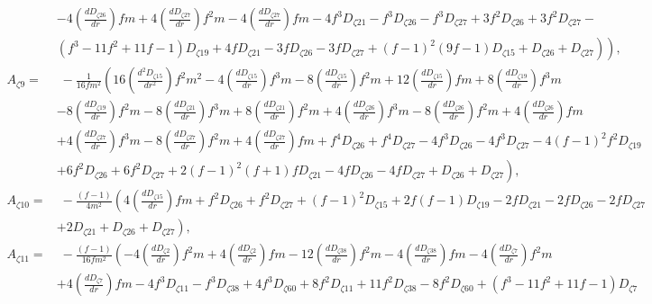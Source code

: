 \documentclass[10pt,twocolumn,preprintnumbers,amsmath,amssymb,nofootinbib
,superscriptaddress]{revtex4-1}
\begin{document}
{{{\begin{widetext}
\begin{align}
 &\left.\left.-4 \left(\frac{dD_{\zeta26}}{dr}\right) f m+4 \left(\frac{dD_{\zeta27}}{dr}\right) f^2 m-4
 \left(\frac{dD_{\zeta27}}{dr}\right) f m-4 f^3 D_{\zeta21}-f^3 D_{\zeta26}-f^3
 D_{\zeta27}+3 f^2 D_{\zeta26}+3 f^2
 D_{\zeta27}-\right.\right.\nonumber\\
 &\left.\left.\left(f^3-11 f^2+11 f-1\right) D_{\zeta19}+4 f
 D_{\zeta21}-3 f D_{\zeta26}-3 f
 D_{\zeta27}+(f-1)^2 (9 f-1)
 D_{\zeta15}+D_{\zeta26}+D_{\zeta27}\right)\right), \nonumber\\
A_{\zeta9}=&\;-\frac{1}{16 f m^2}\left(16 \left(\frac{d^2D_{\zeta15}}{dr^2}\right) f^2 m^2-4 \left(\frac{dD_{\zeta15}}{dr}\right) f^3 m-8 \left(\frac{dD_{\zeta15}}{dr}\right) f^2 m+12 \left(\frac{dD_{\zeta15}}{dr}\right)
 f m+8 \left(\frac{dD_{\zeta19}}{dr}\right) f^3 m\right.\nonumber\\
 &\left.-8 \left(\frac{dD_{\zeta19}}{dr}\right) f^2 m-8 \left(\frac{dD_{\zeta21}}{dr}\right) f^3 m+8 \left(\frac{dD_{\zeta21}}{dr}\right) f^2
 m+4 \left(\frac{dD_{\zeta26}}{dr}\right) f^3 m-8 \left(\frac{dD_{\zeta26}}{dr}\right) f^2 m+4 \left(\frac{dD_{\zeta26}}{dr}\right) f m\right.\nonumber\\
 &\left.+4 \left(\frac{dD_{\zeta27}}{dr}\right) f^3 m-8
 \left(\frac{dD_{\zeta27}}{dr}\right) f^2 m+4 \left(\frac{dD_{\zeta27}}{dr}\right) f m+f^4 D_{\zeta26}+f^4
 D_{\zeta27}-4 f^3 D_{\zeta26}-4 f^3
 D_{\zeta27}-4 (f-1)^2 f^2 D_{\zeta19}\right.\nonumber\\
 &\left.+6 f^2
 D_{\zeta26}+6 f^2 D_{\zeta27}+2 (f-1)^2 (f+1) f
 D_{\zeta21}-4 f D_{\zeta26}-4 f
 D_{\zeta27}+D_{\zeta26}+D_{\zeta27}\right), \nonumber\\
 A_{\zeta10}=&\;-\frac{(f-1)}{4
 m^2} \left(4 \left(\frac{dD_{\zeta15}}{dr}\right) f m+f^2 D_{\zeta26}+f^2
 D_{\zeta27}+(f-1)^2 D_{\zeta15}+2 f (f-1)
 D_{\zeta19}-2 f D_{\zeta21}-2 f D_{\zeta26}-2 f
 D_{\zeta27}\right.\nonumber\\
 &\left.+2
 D_{\zeta21}+D_{\zeta26}+D_{\zeta27}\right), \nonumber\\
 A_{\zeta11}=&\;-\frac{(f-1)}{16 f m^2} \left(-4 \left(\frac{dD_{\zeta2}}{dr}\right) f^2 m+4 \left(\frac{dD_{\zeta2}}{dr}\right) f m-12 \left(\frac{dD_{\zeta38}}{dr}\right) f^2 m-4
 \left(\frac{dD_{\zeta38}}{dr}\right) f m-4 \left(\frac{dD_{\zeta7}}{dr}\right) f^2 m\right.\nonumber\\
 &\left.+4 \left(\frac{dD_{\zeta7}}{dr}\right) f m-4 f^3
 D_{\zeta11}-f^3 D_{\zeta38}+4 f^3 D_{\zeta60}+8
 f^2 D_{\zeta11}+11 f^2 D_{\zeta38}-8 f^2
 D_{\zeta60}+\left(f^3-11 f^2+11 f-1\right)
 D_{\zeta7}\right.\nonumber\\

\end{align}
\end{widetext}}}}
\end{document}
